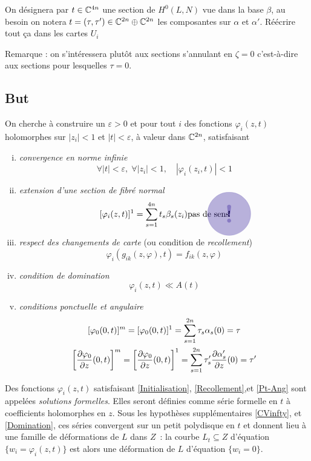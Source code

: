 \documentclass[a4paper,11pt,draft,makeidx,twocolumn]{amsart}
\begin{document}
On désignera par $t \in \mathbb{C}^{4n}$ une section de $H^0(L,N)$ vue dans la base $\beta$, au besoin on notera $t = (\tau, \tau') \in \mathbb{C}^{2n} \oplus \mathbb{C}^{2n}$ les composantes sur $\alpha$ et $\alpha'$. Réécrire tout ça dans les cartes $U_i$\excl

Remarque : on s’intéressera plutôt aux sections s'annulant en $\zeta = 0$ c'est-à-dire aux sections pour lesquelles $\tau = 0$.

\subsection{But}
On cherche à construire un $\varepsilon>0$ et pour tout $i$ des fonctions $\varphi_i(z,t)$ holomorphes sur $|z_i| < 1$ et $|t|<\varepsilon$, à valeur dans $\mathbb{C}^{2n}$, satisfaisant
\begin{enumerate}[(i)]
\item \emph{convergence en norme infinie}\label{CVinfty}
\[
\forall |t| < \varepsilon,\; \forall |z_i| < 1, \quad  | \varphi_i(z_i,t) | < 1
\]
\item \emph{extension d'une section de fibré normal}\label{Initialisation}
\[
[\varphi_i(z,t)]^1 = \sum_{s=1}^{4n} t_s \beta_s(z_i)\text{pas de sens}\excl
\]
\item \emph{respect des changements de carte} (ou condition de \emph{recollement})\label{Recollement}
\[
\varphi_i(g_{ik}(z,\varphi),t) = f_{ik}(z, \varphi)
\]
\item \emph{condition de domination}\label{Domination}
\[
\varphi_i(z,t) \ll A(t)
\]
\item \emph{conditions ponctuelle et angulaire}\label{Pt-Ang}
\begin{subequations}
\begin{gather}
	[\varphi_0(0,t)]^m = [\varphi_0(0,t)]^1  = \sum_{s=1}^{2n} \tau_s \alpha_s(0) = \tau\label{E:Pt}\\
	\left[\dfrac{\partial{\varphi_0}}{\partial{z}}(0,t)\right]^m = \left[\dfrac{\partial{\varphi_0}}{\partial{z}}(0,t)\right]^1  = \sum_{s=1}^{2n} \tau'_s \dfrac{\partial{\alpha'_s}}{\partial{z}}(0) = \tau' \label{E:Ang}
\end{gather}
\end{subequations}
\end{enumerate}

Des fonctions $\varphi_i(z,t)$ satisfaisant \eqref{Initialisation}, \eqref{Recollement},et \eqref{Pt-Ang} sont appelées \emph{solutions formelles}. Elles seront définies comme série formelle en $t$ à coefficients holomorphes en $z$. Sous les hypothèses supplémentaires \eqref{CVinfty}, et \eqref{Domination}, ces séries convergent sur un petit polydisque en $t$ et donnent lieu à une famille de déformations de $L$ dans $Z$~: la courbe $L_t \subseteq Z$ d'équation $\{w_i = \varphi_i(z,t)\}$ est alors une déformation de $L$ d'équation $\{w_i = 0\}$.
\end{document}
